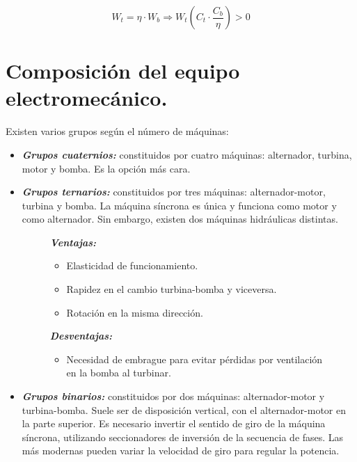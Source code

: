 			\[W_t = \eta \cdot W_b \Rightarrow W_t\left(C_t\cdot \dfrac{C_b}{\eta}\right)>0\]
			
	\section{Composición del equipo electromecánico.}
		Existen varios grupos según el número de máquinas:
		\begin{itemize}
			\item \textbf{\textit{Grupos cuaternios:}} constituidos por cuatro máquinas: alternador, turbina, motor y bomba. Es la opción más cara.
			
			\item \textbf{\textit{Grupos ternarios:}} constituidos por tres máquinas: alternador-motor, turbina y bomba. La máquina síncrona es única y funciona como motor y como alternador. Sin embargo, existen dos máquinas hidráulicas distintas.
			
			\begin{figure}[H]
				\hspace{0.8cm}
				\begin{minipage}[t]{0.4\textwidth}
					\textbf{\textit{Ventajas:}}
					\begin{itemize}
						\item Elasticidad de funcionamiento.
						\item Rapidez en el cambio turbina-bomba y viceversa.
						\item Rotación en la misma dirección.
					\end{itemize}
				\end{minipage}
				\hspace{0.5cm}
				\begin{minipage}[t]{0.5\textwidth}
					\textbf{\textit{Desventajas:}}
					\begin{itemize}
						\item Necesidad de embrague para evitar pérdidas por ventilación en la bomba al turbinar.
					\end{itemize}
				\end{minipage}
			\end{figure}
			
			\item \textbf{\textit{Grupos binarios:}} constituidos por dos máquinas: alternador-motor y turbina-bomba. Suele ser de disposición vertical, con el alternador-motor en la parte superior. Es necesario invertir el sentido de giro de la máquina síncrona, utilizando seccionadores de inversión de la secuencia de fases. Las más modernas pueden variar la velocidad de giro para regular la potencia.
			

\end{itemize}

